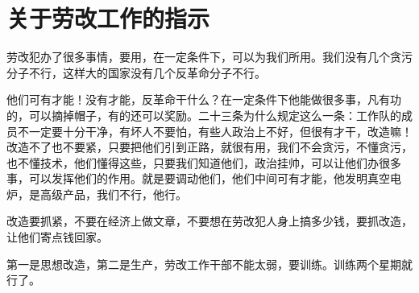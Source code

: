 \section[关于劳改工作的指示（一九六五年四月）]{关于劳改工作的指示}


劳改犯办了很多事情，要用，在一定条件下，可以为我们所用。我们没有几个贪污分子不行，这样大的国家没有几个反革命分子不行。

他们可有才能！没有才能，反革命干什么？在一定条件下他能做很多事，凡有功的，可以摘掉帽子，有的还可以奖励。二十三条为什么规定这么一条：工作队的成员不一定要十分干净，有坏人不要怕，有些人政治上不好，但很有才干，改造嘛！改造不了也不要紧，只要把他们引到正路，就很有用，我们不会贪污，不懂贪污，也不懂技术，他们懂得这些，只要我们知道他们，政治挂帅，可以让他们办很多事，可以发挥他们的作用。就是要调动他们，他们中间可有才能，他发明真空电炉，是高级产品，我们不行，他行。


改造要抓紧，不要在经济上做文章，不要想在劳改犯人身上搞多少钱，要抓改造，让他们寄点钱回家。

第一是思想改造，第二是生产，劳改工作干部不能太弱，要训练。训练两个星期就行了。



